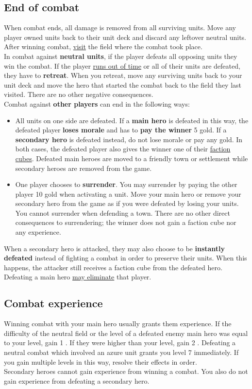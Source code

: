 \documentclass[12pt]{article}
\begin{document}
\subsection*{\hypertarget{Endcombat}{End of combat}}
When combat ends, all damage is removed from all surviving units. Move any player owned units back to their unit deck and discard any leftover neutral units. After winning combat, \hyperlink{Categories}{visit} the field where the combat took place.\\[6pt]
In combat against \textbf{neutral units}, if the player defeats all opposing units they win the combat. If the player \hyperlink{Timelimit}{runs out of time} or all of their units are defeated, they have to \textbf{retreat}. When you retreat, move any surviving units back to your unit deck and move the hero that started the combat back to the field they last visited. There are no other negative consequences.\\[6pt]
Combat against \textbf{other players} can end in the following ways:
\begin{itemize}
    \item All units on one side are defeated. If a \textbf{main hero} is defeated in this way, the defeated player \textbf{loses morale} and has to \textbf{pay the winner} 5 gold. If a \textbf{secondary hero} is defeated instead, do not lose morale or pay any gold. In both cases, the defeated player also gives the winner one of their \hyperlink{End}{faction cubes}. Defeated main heroes are moved to a friendly town or settlement while secondary heroes are removed from the game.
    \item One player chooses to \textbf{surrender}. You may surrender by paying the other player 10 gold when activating a unit. Move your main hero or remove your secondary hero from the game as if you were defeated by losing your units. You cannot surrender when defending a town. There are no other direct consequences to surrendering; the winner does not gain a faction cube nor any experience.
\end{itemize}
 When a secondary hero is attacked, they may also choose to be \textbf{instantly defeated} instead of fighting a combat in order to preserve their units. When this happens, the attacker still receives a faction cube from the defeated hero.\\[6pt] Defeating a main hero \hyperlink{End}{may eliminate} that player.

\subsection*{\hypertarget{Combatexperience}{Combat experience}}
Winning combat with your main hero usually grants them experience. If the difficulty of the neutral field or the level of a defeated enemy main hero was equal to your level, gain 1 . If they were higher than your level, gain 2 . Defeating a neutral combat which involved an azure unit grants you level 7 immediately. If you gain multiple levels in this way, resolve their effects in order.\\[6pt]
Secondary heroes cannot gain experience from winning a combat. You also do not gain experience from defeating a secondary hero.
\end{document}
